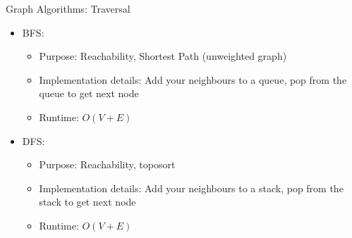 \documentclass{beamer}
\begin{document}
\begin{frame}[t]{Graph Algorithms: Traversal}
  \begin{itemize}
    \pause
      \item \alert{BFS:} 
      \begin{itemize}
          \item \alert{Purpose:} Reachability, Shortest Path (unweighted graph)
          \item \alert{Implementation details:} Add your neighbours to a \alert{queue}, pop from the queue to get next node
          \item \alert{Runtime:} $O(V + E)$
      \end{itemize}
    \pause
      \item \alert{DFS:} 
      \begin{itemize}
          \item \alert{Purpose:} Reachability, toposort 
          \item \alert{Implementation details:} Add your neighbours to a \alert{stack}, pop from the stack to get next node
          \item \alert{Runtime:} $O(V + E)$
      \end{itemize}
  \end{itemize}
\end{frame}
\end{document}
